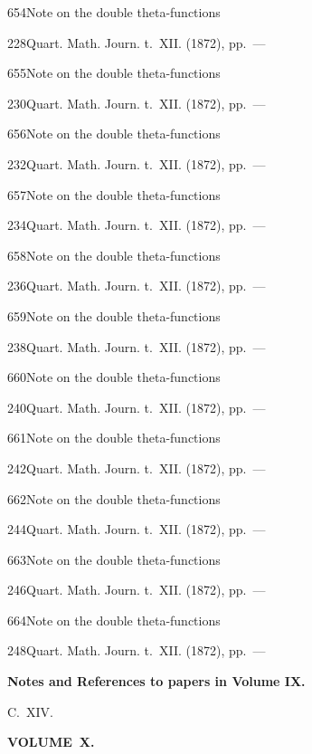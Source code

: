 \documentclass[11pt,a4paper]{book}
\providecommand{\tocentry}[2]{#1\dotfill #2\par}
\begin{document}
\tocentry{654}{Note on the double theta-functions}{228}{Quart. Math. Journ. t.~XII. (1872), pp.~---}

\tocentry{655}{Note on the double theta-functions}{230}{Quart. Math. Journ. t.~XII. (1872), pp.~---}

\tocentry{656}{Note on the double theta-functions}{232}{Quart. Math. Journ. t.~XII. (1872), pp.~---}

\tocentry{657}{Note on the double theta-functions}{234}{Quart. Math. Journ. t.~XII. (1872), pp.~---}

\tocentry{658}{Note on the double theta-functions}{236}{Quart. Math. Journ. t.~XII. (1872), pp.~---}

\tocentry{659}{Note on the double theta-functions}{238}{Quart. Math. Journ. t.~XII. (1872), pp.~---}

\tocentry{660}{Note on the double theta-functions}{240}{Quart. Math. Journ. t.~XII. (1872), pp.~---}

\tocentry{661}{Note on the double theta-functions}{242}{Quart. Math. Journ. t.~XII. (1872), pp.~---}

\tocentry{662}{Note on the double theta-functions}{244}{Quart. Math. Journ. t.~XII. (1872), pp.~---}

\tocentry{663}{Note on the double theta-functions}{246}{Quart. Math. Journ. t.~XII. (1872), pp.~---}

\tocentry{664}{Note on the double theta-functions}{248}{Quart. Math. Journ. t.~XII. (1872), pp.~---}

\vspace{1cm}
\noindent\textbf{Notes and References to papers in Volume IX.} 
\clearpage


\thispagestyle{empty}
\noindent\hfill{\large C.~XIV.}\hfill\null\vspace{0.5em}

\begin{center}
{\Large\bfseries VOLUME~X.}
\end{center}
\vspace{0.5em}
\end{document}
